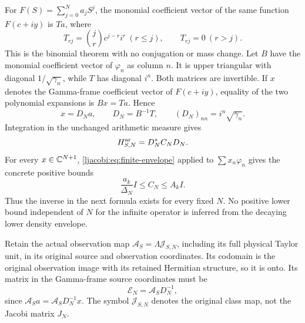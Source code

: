 \documentclass[11pt]{article}
\begin{document}
For $F(S)=\sum_{j=0}^N a_jS^j$, the monomial coefficient vector
of the same function $F(c+iy)$ is $Ta$, where
\[
 T_{rj}=\binom jr c^{j-r}i^r\ (r\leq j),\qquad T_{rj}=0\ (r>j).
\]
This is the binomial theorem with no conjugation or mass change.
Let $B$ have the monomial coefficient vector of $\varphi_n$ as
column $n$. It is upper triangular with diagonal
$1/\sqrt{\gamma_n}$, while $T$ has diagonal $i^n$.
Both matrices are invertible. If $x$ denotes the Gamma-frame
coefficient vector of $F(c+iy)$, equality of the two polynomial
expansions is $Bx=Ta$. Hence
\begin{equation}\label{ljacobi:eq:source}
 x=D_Na,\qquad D_N=B^{-1}T,\qquad
 (D_N)_{nn}=i^n\sqrt{\gamma_n}.
\end{equation}
Integration in the unchanged arithmetic measure gives
\begin{equation}\label{ljacobi:eq:gram}
 H_{S,N}^{\rm ar}=D_N^*C_ND_N.
\end{equation}
For every $x\in\mathbb C^{N+1}$, \eqref{ljacobi:eq:finite-envelope} applied to
$\sum x_n\varphi_n$ gives the concrete positive bounds
\begin{equation}\label{ljacobi:eq:CN-bounds}
 \frac{a_k}{\Delta_N}I\leq C_N\leq A_kI.
\end{equation}
Thus the inverse in the next formula exists for every fixed $N$.
No positive lower bound independent of $N$ for the infinite
operator is inferred from the decaying lower density envelope.

Retain the actual observation map
$\mathcal A_S=\Lambda\mathcal J_{S,N}$, including its full physical
Taylor unit, in its original source and observation coordinates.
Its codomain is the original observation image with its retained
Hermitian structure, so it is onto. Its matrix in the Gamma-frame
source coordinates must be
\begin{equation}\label{ljacobi:eq:E}
 \mathcal E_N=\mathcal A_SD_N^{-1},
\end{equation}
since $\mathcal A_Sa=\mathcal A_SD_N^{-1}x$. The symbol
$\mathcal J_{S,N}$ denotes the original class map, not the Jacobi
matrix $J_N$.
\end{document}
